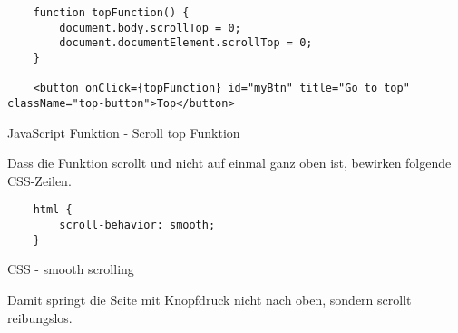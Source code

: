\begin{code}[htp]
\begin{lstlisting}
    function topFunction() {
        document.body.scrollTop = 0;
        document.documentElement.scrollTop = 0;
    }

    <button onClick={topFunction} id="myBtn" title="Go to top" className="top-button">Top</button>
\end{lstlisting}
\caption{JavaScript Funktion - Scroll top Funktion}
\end{code}

Dass die Funktion scrollt und nicht auf einmal ganz oben ist, bewirken folgende CSS-Zeilen.

\begin{code}[htp]
\begin{lstlisting}
    html {
        scroll-behavior: smooth;
    }
\end{lstlisting}
\caption{CSS - smooth scrolling}
\end{code}

Damit springt die Seite mit Knopfdruck nicht nach oben, sondern scrollt reibungslos.